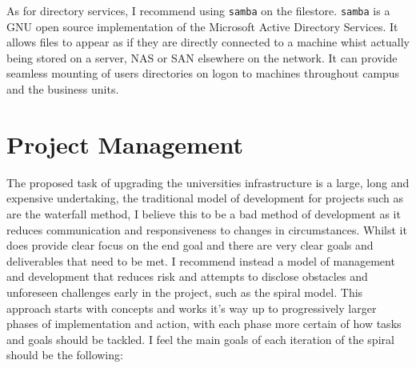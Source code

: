 \documentclass[10pt]{article}
\begin{document}
        As for directory services, I recommend using \texttt{samba} on the filestore. \texttt{samba} is a GNU open source implementation of the Microsoft Active Directory Services. It allows files to appear as if they are directly connected to a machine whist actually being stored on a server, NAS or SAN elsewhere on the network. It can provide seamless mounting of users directories on logon to machines throughout campus and the business units. 

    \section{Project Management}
        The proposed task of upgrading the universities infrastructure is a large, long and expensive undertaking, the traditional model of development for projects such as are the waterfall method, I believe this to be a bad method of development as it reduces communication and responsiveness to changes in circumstances. Whilst it does provide clear focus on the end goal and there are very clear goals and deliverables that need to be met. I recommend instead a model of management and development that reduces risk and attempts to disclose obstacles and unforeseen challenges early in the project, such as the spiral model. This approach starts with concepts and works it's way up to progressively larger phases of implementation and action, with each phase more certain of how tasks and goals should be tackled. I feel the main goals of each iteration of the spiral should be the following:
\end{document}
